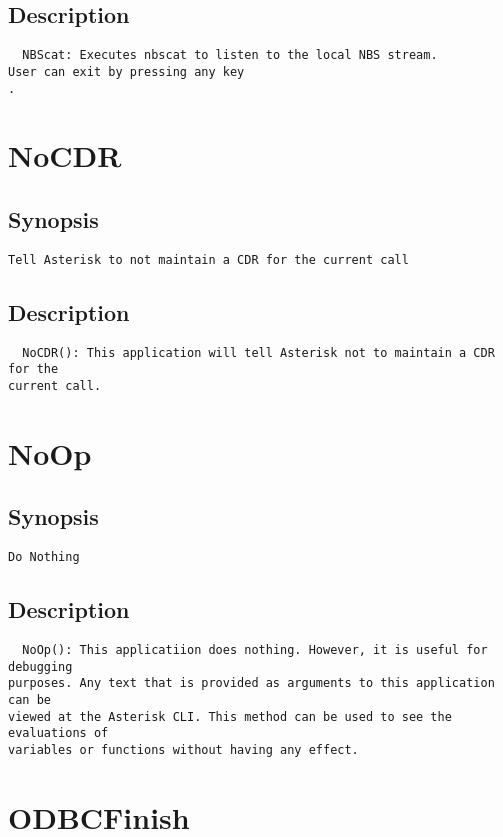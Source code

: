 \subsection{Description}
\begin{verbatim}
  NBScat: Executes nbscat to listen to the local NBS stream.
User can exit by pressing any key
.
\end{verbatim}


\section{NoCDR}
\subsection{Synopsis}
\begin{verbatim}
Tell Asterisk to not maintain a CDR for the current call
\end{verbatim}
\subsection{Description}
\begin{verbatim}
  NoCDR(): This application will tell Asterisk not to maintain a CDR for the
current call.

\end{verbatim}


\section{NoOp}
\subsection{Synopsis}
\begin{verbatim}
Do Nothing
\end{verbatim}
\subsection{Description}
\begin{verbatim}
  NoOp(): This applicatiion does nothing. However, it is useful for debugging
purposes. Any text that is provided as arguments to this application can be
viewed at the Asterisk CLI. This method can be used to see the evaluations of
variables or functions without having any effect.
\end{verbatim}


\section{ODBCFinish}
